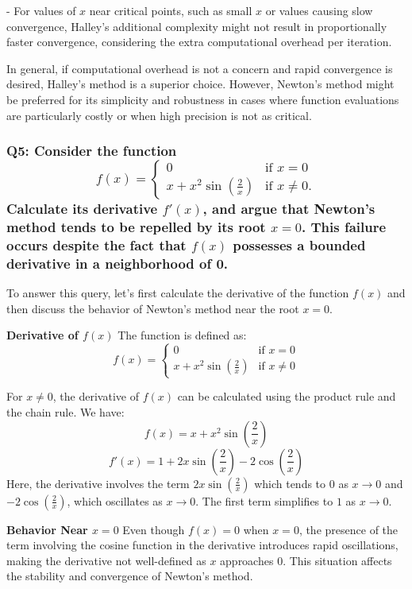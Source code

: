 \documentclass[8pt]{article}
\begin{document}
- For values of \(x\) near critical points, such as small \(x\) or values causing slow convergence, Halley’s additional complexity might not result in proportionally faster convergence, considering the extra computational overhead per iteration.

In general, if computational overhead is not a concern and rapid convergence is desired, Halley's method is a superior choice. However, Newton's method might be preferred for its simplicity and robustness in cases where function evaluations are particularly costly or when high precision is not as critical.

\subsubsection*{Q5: Consider the function
\[ f(x) = \begin{cases} 
0 & \text{if } x = 0 \\
x + x^2 \sin\left(\frac{2}{x}\right) & \text{if } x \neq 0.
\end{cases} \]
Calculate its derivative \(f'(x)\), and argue that Newton’s method tends to be repelled by its root \(x = 0\). This failure occurs despite the fact that \(f(x)\) possesses a bounded derivative in a neighborhood of 0.}

To answer this query, let's first calculate the derivative of the function \(f(x)\) and then discuss the behavior of Newton's method near the root \(x = 0\).

\textbf{Derivative of \(f(x)\)}
The function is defined as:
\[
f(x) = \begin{cases} 
0 & \text{if } x = 0 \\
x + x^2 \sin\left(\frac{2}{x}\right) & \text{if } x \neq 0
\end{cases}
\]

For \(x \neq 0\), the derivative of \(f(x)\) can be calculated using the product rule and the chain rule. We have:
\[
f(x) = x + x^2 \sin\left(\frac{2}{x}\right)
\]
\[
f'(x) = 1 + 2x \sin\left(\frac{2}{x}\right) - 2 \cos\left(\frac{2}{x}\right)
\]
Here, the derivative involves the term \(2x \sin\left(\frac{2}{x}\right)\) which tends to \(0\) as \(x \to 0\) and \(-2 \cos\left(\frac{2}{x}\right)\), which oscillates as \(x \to 0\). The first term simplifies to \(1\) as \(x \to 0\).

\textbf{Behavior Near \(x = 0\)}
Even though \(f(x) = 0\) when \(x = 0\), the presence of the term involving the cosine function in the derivative introduces rapid oscillations, making the derivative not well-defined as \(x\) approaches \(0\). This situation affects the stability and convergence of Newton's method.
\end{document}
